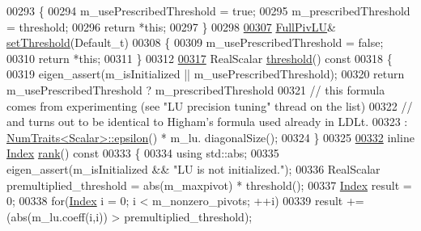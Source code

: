 \begin{DoxyCode}
00293     \{
00294       m\_usePrescribedThreshold = \textcolor{keyword}{true};
00295       m\_prescribedThreshold = threshold;
00296       \textcolor{keywordflow}{return} *\textcolor{keyword}{this};
00297     \}
00298 
\hyperlink{group___l_u___module_a1b5e30add3dfb6625da1213d68418f44}{00307}     \hyperlink{group___l_u___module_class_eigen_1_1_full_piv_l_u}{FullPivLU}& \hyperlink{group___l_u___module_a1b5e30add3dfb6625da1213d68418f44}{setThreshold}(Default\_t)
00308     \{
00309       m\_usePrescribedThreshold = \textcolor{keyword}{false};
00310       \textcolor{keywordflow}{return} *\textcolor{keyword}{this};
00311     \}
00312 
\hyperlink{group___l_u___module_ad77539203694f2d85ff7d11616e5a0a5}{00317}     RealScalar \hyperlink{group___l_u___module_ad77539203694f2d85ff7d11616e5a0a5}{threshold}()\textcolor{keyword}{ const}
00318 \textcolor{keyword}{    }\{
00319       eigen\_assert(m\_isInitialized || m\_usePrescribedThreshold);
00320       \textcolor{keywordflow}{return} m\_usePrescribedThreshold ? m\_prescribedThreshold
00321       \textcolor{comment}{// this formula comes from experimenting (see "LU precision tuning" thread on the list)}
00322       \textcolor{comment}{// and turns out to be identical to Higham's formula used already in LDLt.}
00323                                       : \hyperlink{group___core___module_struct_eigen_1_1_num_traits}{NumTraits<Scalar>::epsilon}() * m\_lu.
      diagonalSize();
00324     \}
00325 
\hyperlink{group___l_u___module_a67a870aa69e699e058d04802ba0bdad9}{00332}     \textcolor{keyword}{inline} \hyperlink{group___core___module_a554f30542cc2316add4b1ea0a492ff02}{Index} \hyperlink{group___l_u___module_a67a870aa69e699e058d04802ba0bdad9}{rank}()\textcolor{keyword}{ const}
00333 \textcolor{keyword}{    }\{
00334       \textcolor{keyword}{using} std::abs;
00335       eigen\_assert(m\_isInitialized && \textcolor{stringliteral}{"LU is not initialized."});
00336       RealScalar premultiplied\_threshold = abs(m\_maxpivot) * threshold();
00337       \hyperlink{group___core___module_a554f30542cc2316add4b1ea0a492ff02}{Index} result = 0;
00338       \textcolor{keywordflow}{for}(\hyperlink{group___core___module_a554f30542cc2316add4b1ea0a492ff02}{Index} i = 0; i < m\_nonzero\_pivots; ++i)
00339         result += (abs(m\_lu.coeff(i,i)) > premultiplied\_threshold);

\end{DoxyCode}
